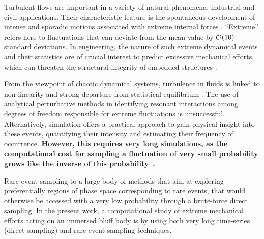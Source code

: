 \documentclass{jfm}
\newcommand{\EL}[1]{{\color{myred}{#1}}}
\begin{document}
%
Turbulent flows are important in a variety of natural phenomena, industrial and civil applications.
Their characteristic feature is the spontaneous development of intense and sporadic motions associated with extreme internal forces \citep{lesieur_book,donzis_sreenivasan_2010,Yeung}.
``Extreme'' refers here to fluctuations that can deviate from the mean value by ${\cal{O}}(10)$ standard deviations.
In engineering, the nature of such extreme dynamical events and their statistics are of crucial interest to predict excessive mechanical efforts, which can threaten the structural integrity of embedded structures \EL{\citep{kanev2010}}.
%

From the viewpoint of chaotic dynamical systems, turbulence in fluids is linked to non-linearity and strong departure from statistical equilibrium \citep{KRAICHNAN}.
The use of analytical perturbative methods in identifying resonant interactions among degrees of freedom responsible for extreme fluctuations is unsuccessful.
Alternatively, simulation offers a practical approach to gain physical insight into these events, quantifying their intensity and estimating their frequency of occurrence.
\textbf{However, this requires very long simulations, as the computational cost for sampling a fluctuation of very small probability grows like the inverse of this probability~\cite{wouters2016rare}.}

%
{Rare-event sampling \EL{refers} to a large body of methods that aim at exploring preferentially regions of phase space corresponding to rare events, that would otherwise be accessed with a very low probability through a brute-force direct sampling.}
%
In the present work, a computational study of extreme mechanical efforts acting on an immersed bluff body is \EL{conducted} by using both very long time-series (direct sampling) and rare-event sampling techniques.
%	
\end{document}
